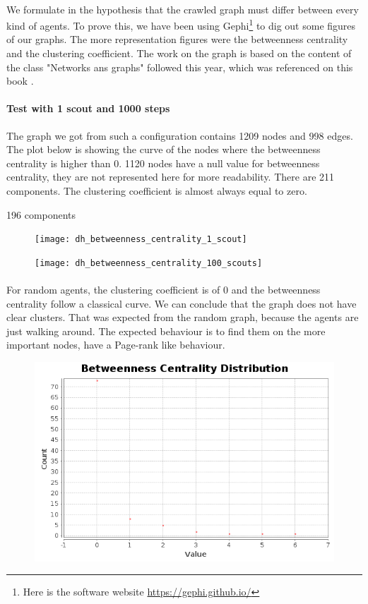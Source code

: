 \documentclass{article}
\begin{document}
	\paragraph{}
	We formulate in the hypothesis that the crawled graph must differ between every kind of agents.
	To prove this, we have been using Gephi\footnote{
	Here is the software website \url{https://gephi.github.io/}
	} to dig out some figures of our graphs.
	The more representation figures were the betweenness centrality and the clustering coefficient.
	The work on the graph is based on the content of the class "Networks ans graphs" followed this year,
	which was referenced on this book \cite{Steen10}.
	\paragraph{Test with 1 scout and 1000 steps}
	The graph we got from such a configuration contains 1209 nodes and 998 edges.
	The plot below is showing the curve of the nodes where the betweenness centrality is higher than 0.
	1120 nodes have a null value for betweenness centrality, they are not represented here for more readability.
	There are 211 components.
	The clustering coefficient is almost always equal to zero.

	196 components
	\begin{figure}[!h]
		\texttt{[image: dh\_betweenness\_centrality\_1\_scout]}
	\end{figure}
	\begin{figure}[!h]
		\texttt{[image: dh\_betweenness\_centrality\_100\_scouts]}
	\end{figure}
	\paragraph{}
	For random agents, the clustering coefficient is of $0$ and the betweenness centrality follow a classical curve.
	We can conclude that the graph does not have clear clusters.
	That was expected from the random graph, because the agents are just walking around.
	The expected behaviour is to find them on the more important nodes, have a Page-rank like behaviour.
	\begin{figure}[!h]
	\includegraphics[width=1\textwidth]{dh_betweenness_centrality_random}
	\end{figure}
\end{document}
